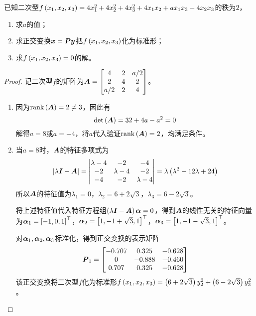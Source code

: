 \begin{problem}
已知二次型\(f\left( x_1,x_2,x_3 \right)=4x_1^2+4x_2^2+4x_3^2+4x_1x_2+ax_1x_3-4x_2x_3\)的秩为\(2\)，
\begin{enumerate}
    \item 求\(a\)的值；
    \item 求正交变换\(\boldsymbol{x}=\boldsymbol{P}\boldsymbol{y}\)把\(f\left( x_1,x_2,x_3 \right)\)化为标准形；
    \item 求\(f\left( x_1,x_2,x_3 \right)=0\)的解。
\end{enumerate}
\end{problem}
\begin{proof}
    记二次型\(f\)的矩阵为\(\boldsymbol{A}=\begin{bmatrix}4&2&a/2\\2&4&2\\a/2&2&4\end{bmatrix}\)。
    \begin{enumerate}
        \item {
              因为\(\mathrm{rank}\left( \boldsymbol{A} \right)=2\neq3\)，因此有
              \begin{equation*}
                  \mathrm{det}\left( \boldsymbol{A} \right)=32+4a-a^2=0
              \end{equation*}
              解得\(a=8\)或\(a=-4\)，将\(a\)代入验证\(\mathrm{rank}\left( \boldsymbol{A} \right)=2\)，均满足条件。
              }
        \item {
              当\(a=8\)时，\(\boldsymbol{A}\)的特征多项式为
              \begin{equation*}
                  \left|\lambda\boldsymbol{I}-\boldsymbol{A} \right|=\begin{vmatrix}\lambda-4&-2&-4\\-2&\lambda-4&-2\\-4&-2&\lambda-4\end{vmatrix}=\lambda\left( \lambda^2-12\lambda+24 \right)
              \end{equation*}
              所以\(\boldsymbol{A}\)的特征值为\(\lambda_1=0\)，\(\lambda_2=6+2\sqrt{3}\)，\(\lambda_3=6-2\sqrt{3}\)。

              将上述特征值代入特征方程组\(\left( \lambda\boldsymbol{I}-\boldsymbol{A} \right)\boldsymbol{\alpha}=0\)，得到\(\boldsymbol{A}\)的线性无关的特征向量为\(\boldsymbol{\alpha}_1=\left[ -1,0,1 \right]^\top\)，\(\boldsymbol{\alpha}_2=\left[ 1,-1+\sqrt{3},1 \right]^\top\)，\(\boldsymbol{\alpha}_3=\left[ 1,-1-\sqrt{3},1 \right]^\top\)。

              对\(\boldsymbol{\alpha}_1,\boldsymbol{\alpha}_2,\boldsymbol{\alpha}_3\)标准化，得到正交变换的表示矩阵
              \begin{equation*}
                  \boldsymbol{P}_1=
                  \begin{bmatrix}
                      -0.707 & 0.325  & -0.628 \\
                      0      & -0.888 & -0.460 \\
                      0.707  & 0.325  & -0.628
                  \end{bmatrix}
              \end{equation*}
              该正交变换将二次型\(f\)化为标准形\(f\left( x_1,x_2,x_3 \right)=\left( 6+2\sqrt{3} \right)y_2^2+\left( 6-2\sqrt{3} \right)y_3^2\)。

}
\end{enumerate}
\end{proof}
